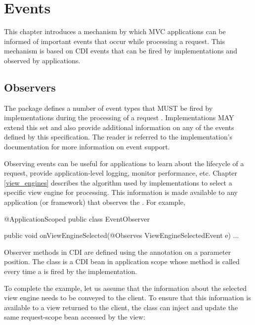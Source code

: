 \chapter{Events}
\label{events}

This chapter introduces a mechanism by which MVC applications can be informed 
of important events that occur while processing a request. This mechanism 
is based on CDI events that can be fired by implementations and observed by 
applications.

\section{Observers}
\label{observers}

The package  defines a number of event types that MUST be 
fired by implementations during the processing of a request . 
Implementations MAY
extend this set and also provide additional information on any of the events defined
by this specification. The reader is referred to the implementation's documentation
for more information on event support.

Observing events can be useful for applications to learn about the lifecycle of a 
request, provide application-level logging, monitor performance, etc. Chapter 
\ref{view_engines} describes the algorithm used by implementations to select a
specific view engine for processing. This information is made available to any
application (or framework) that observes the . For
example,

\begin{listing}{1}
@ApplicationScoped
public class EventObserver {

    public void onViewEngineSelected(@Observes ViewEngineSelectedEvent e) {
        ...
    }
}
\end{listing}

Observer methods in CDI are defined using the  annotation on 
a parameter position.
The class  is a CDI bean in application scope whose method
 is called every time a 
is fired by the implementation. 

To complete the example, let us assume that the information about the selected
view engine needs to be conveyed to the client. To ensure that this information
is available to a view returned to the client, the  class
can inject and update the same request-scope bean accessed by the view:

